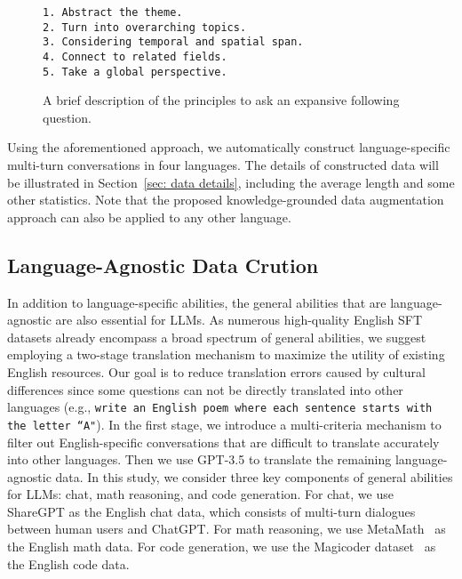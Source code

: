 \documentclass[11pt]{article}
\begin{document}
\begin{figure}[h]
\begin{tcolorbox}[colback=red!2,colframe=red!50!black]
\small
\texttt{1. Abstract the theme.\\
2. Turn into overarching topics.\\
3. Considering temporal and spatial span.\\
4. Connect to related fields. \\
5. Take a global perspective.}
\end{tcolorbox}
\caption{A brief description of the principles to ask an expansive following question.}
\label{fig:width-question}
\end{figure}

Using the aforementioned approach, we automatically construct language-specific multi-turn conversations in four languages.
The details of constructed data will be illustrated in Section~\ref{sec: data details}, including the average length and some other statistics.
Note that the proposed knowledge-grounded data augmentation approach can also be applied to any other language.


\subsection{Language-Agnostic Data Crution}

In addition to language-specific abilities, the general abilities that are language-agnostic are also essential for LLMs. As numerous high-quality English SFT datasets already encompass a broad spectrum of general abilities, we suggest employing a two-stage translation mechanism to maximize the utility of existing English resources. Our goal is to reduce translation errors caused by cultural differences since some questions can not be directly translated into other languages (e.g., \texttt{write an English poem where each sentence starts with the letter ``A"}). In the first stage, we introduce a multi-criteria mechanism to filter out English-specific conversations that are difficult to translate accurately into other languages. Then we use GPT-3.5 to translate the remaining language-agnostic data. 
In this study, we consider three key components of general abilities for LLMs: chat, math reasoning, and code generation. For chat, we use ShareGPT as the English chat data, which consists of multi-turn dialogues between human users and ChatGPT. For math reasoning, we use MetaMath~\cite{metamath} as the English math data. For code generation, we use the Magicoder dataset~\cite{wei2023magicoder} as the English code data.
\end{document}
